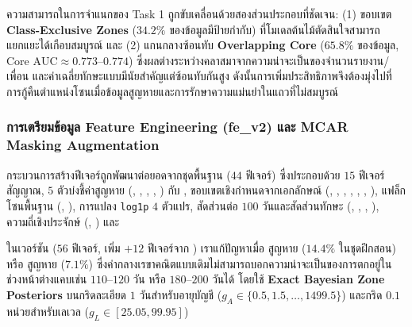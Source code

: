 \begin{insightbox}
ความสามารถในการจำแนกของ Task 1 ถูกขับเคลื่อนด้วยสองส่วนประกอบที่ชัดเจน: (1) ขอบเขต \textbf{Class-Exclusive Zones} ($34.2\%$ ของข้อมูลมีป้ายกำกับ) ที่โมเดลต้นไม้ตัดสินใจสามารถแยกแยะได้เกือบสมบูรณ์ และ (2) แกนกลางซ้อนทับ \textbf{Overlapping Core} ($65.8\%$ ของข้อมูล, $\text{Core AUC} \approx 0.773$--$0.774$) ซึ่งผลต่างระหว่างคลาสมาจากความน่าจะเป็นของจำนวนรายงาน/เพื่อน และค่าเฉลี่ยทักษะแบบมีนัยสำคัญแต่ซ้อนทับกันสูง ดังนั้นการเพิ่มประสิทธิภาพจึงต้องมุ่งไปที่การกู้คืนตำแหน่งโซนเมื่อข้อมูลสูญหายและการรักษาความแม่นยำในแถวที่ไม่สมบูรณ์
\end{insightbox}

\subsubsection{\texorpdfstring{การเตรียมข้อมูล Feature Engineering (fe\_v2) และ MCAR Masking Augmentation}{การเตรียมข้อมูล Feature Engineering (fe\_v2) และ MCAR Masking Augmentation}}

กระบวนการสร้างฟีเจอร์ถูกพัฒนาต่อยอดจากชุดพื้นฐาน  ($44$ ฟีเจอร์) ซึ่งประกอบด้วย $15$ ฟีเจอร์สัญญาณ, $5$ ตัวบ่งชี้ค่าสูญหาย (, , , , ) กับ , ขอบเขตเชิงกำหนดจากเอกลักษณ์  (, , , , , , ), แฟล็กโซนพื้นฐาน (, ), การแปลง \texttt{log1p} $4$ ตัวแปร, สัดส่วนต่อ $100$ วันและสัดส่วนทักษะ (, , , ), ความถี่เชิงประจักษ์ (, ) และ 

ในเวอร์ชัน  ($56$ ฟีเจอร์, เพิ่ม $+12$ ฟีเจอร์จาก ) เราแก้ปัญหาเมื่อ  สูญหาย ($14.4\%$ ในชุดฝึกสอน) หรือ  สูญหาย ($7.1\%$) ซึ่งค่ากลางเรขาคณิตแบบเดิมไม่สามารถบอกความน่าจะเป็นของการตกอยู่ในช่วงหน้าต่างแคบเช่น $110$--$120$ วัน หรือ $180$--$200$ วันได้ โดยใช้ \textbf{Exact Bayesian Zone Posteriors} บนกริดละเอียด $1$ วันสำหรับอายุบัญชี ($g_A \in \{0.5, 1.5, \dots, 1499.5\}$) และกริด $0.1$ หน่วยสำหรับเลเวล ($g_L \in [25.05, 99.95]$)

